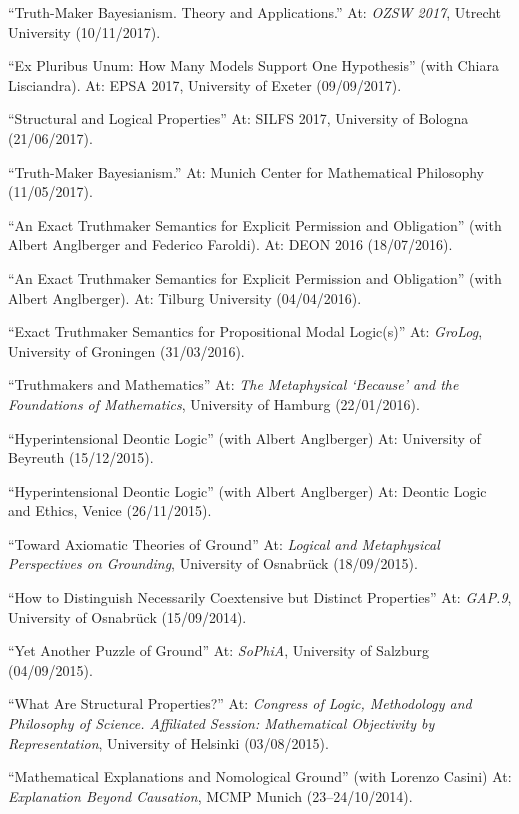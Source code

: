 \begin{etaremune}
  \item ``Truth-Maker Bayesianism. Theory and Applications.'' At: \emph{OZSW 2017}, Utrecht University (10/11/2017).
  \item ``Ex Pluribus Unum: How Many Models Support One Hypothesis'' (with Chiara Lisciandra). At: EPSA 2017, University of Exeter (09/09/2017).
  \item ``Structural and Logical Properties'' At: SILFS 2017, University of Bologna (21/06/2017).
  \item ``Truth-Maker Bayesianism.'' At: Munich Center for Mathematical Philosophy (11/05/2017).
  \item ``An Exact Truthmaker Semantics for Explicit Permission and Obligation'' (with Albert Anglberger and Federico Faroldi). At: DEON 2016 (18/07/2016).
  \item ``An Exact Truthmaker Semantics for Explicit Permission and Obligation'' (with Albert Anglberger). At: Tilburg University (04/04/2016).
  \item ``Exact Truthmaker Semantics for Propositional Modal Logic(s)'' At: \emph{GroLog}, University of Groningen (31/03/2016).
  \item ``Truthmakers and Mathematics'' At: \emph{The Metaphysical `Because' and the Foundations of Mathematics}, University of Hamburg (22/01/2016).
  \item ``Hyperintensional Deontic Logic'' (with Albert Anglberger) At: University of Beyreuth (15/12/2015).
  \item ``Hyperintensional Deontic Logic'' (with Albert Anglberger) At: Deontic Logic and Ethics, Venice (26/11/2015).
  \item ``Toward Axiomatic Theories of Ground'' At: \emph{Logical and Metaphysical Perspectives on Grounding}, University of Osnabr\"uck (18/09/2015).
  \item ``How to Distinguish Necessarily Coextensive but Distinct Properties'' At: \emph{GAP.9}, University of Osnabr\"uck (15/09/2014).
  \item ``Yet Another Puzzle of Ground'' At: \emph{SoPhiA}, University of Salzburg (04/09/2015).
  \item ``What Are Structural Properties?'' At: \emph{Congress of Logic, Methodology and Philosophy of Science. Affiliated Session: Mathematical Objectivity by Representation}, University of Helsinki (03/08/2015).
  \item ``Mathematical Explanations and Nomological Ground'' (with Lorenzo Casini) At: \emph{Explanation Beyond Causation}, MCMP Munich (23--24/10/2014).

\end{etaremune}
